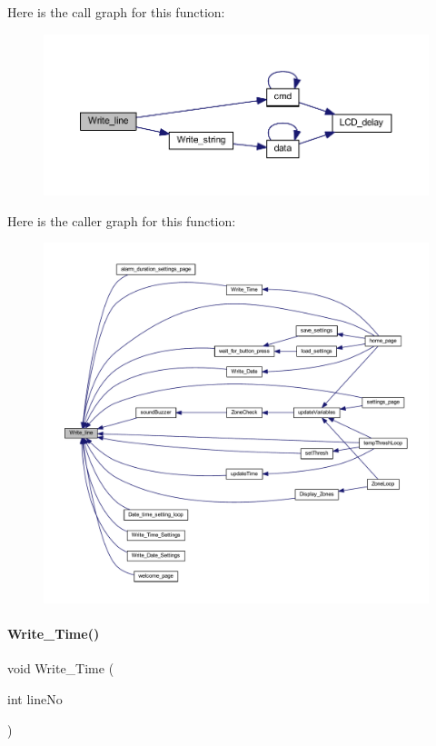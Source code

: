 Here is the call graph for this function\+:
\nopagebreak
\begin{figure}[H]
\begin{center}
\leavevmode
\includegraphics[width=350pt]{a00035_a7a79900a1e7306db896b33ca4a068108_cgraph}
\end{center}
\end{figure}
Here is the caller graph for this function\+:
\nopagebreak
\begin{figure}[H]
\begin{center}
\leavevmode
\includegraphics[width=350pt]{a00035_a7a79900a1e7306db896b33ca4a068108_icgraph}
\end{center}
\end{figure}
\mbox{\label{a00035_a56e791a9efe9fd411e81433c290b733e}} 
\paragraph{Write\+\_\+\+Time()}
{\footnotesize\ttfamily void Write\+\_\+\+Time (\begin{DoxyParamCaption}\item[{int}]{line\+No }\end{DoxyParamCaption})}

